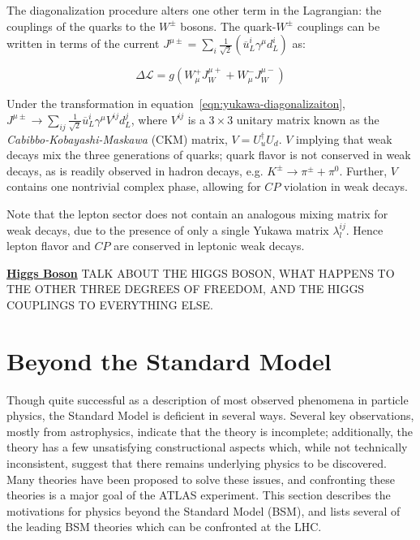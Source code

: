 The diagonalization procedure alters one other term in the Lagrangian: the couplings of the quarks to the $W^{\pm}$ bosons. The quark-$W^{\pm}$ couplings can be written in terms of the current $J^{\mu\pm}=\sum_{i} \frac1{\sqrt{2}}\left(\overline{u}_L^i\gamma^{\mu}d_L^i\right)$ as:

\begin{equation}
	\Delta\mathcal{L} = g (W^+_{\mu}J^{\mu+}_W + W^{-}_{\mu}J^{\mu -}_{W})
\end{equation}

Under the transformation in equation~\ref{eqn:yukawa-diagonalizaiton}, $J^{\mu\pm}\rightarrow \sum_{ij}\frac{1}{\sqrt{2}} \overline{u}_L^i \gamma^{\mu} V^{ij} d_L^j$, where $V^{ij}$ is a $3\times 3$ unitary matrix known as the \emph{Cabibbo-Kobayashi-Maskawa} (CKM) matrix, $V = U_{u}^{\dagger} U_d$. $V$ implying that weak decays mix the three generations of quarks; quark flavor is not conserved in weak decays, as is readily observed in hadron decays, e.g. $K^{\pm}\rightarrow \pi^{\pm}+\pi^0$. Further, $V$ contains one nontrivial complex phase, allowing for $CP$ violation in weak decays. 

Note that the lepton sector does not contain an analogous mixing matrix for weak decays, due to the presence of only a single Yukawa matrix $\lambda^{ij}_l$. Hence lepton flavor and $CP$ are conserved in leptonic weak decays.

\underline{\textbf{Higgs Boson}}
TALK ABOUT THE HIGGS BOSON, WHAT HAPPENS TO THE OTHER THREE DEGREES OF FREEDOM, AND THE HIGGS COUPLINGS TO EVERYTHING ELSE.




\section{Beyond the Standard Model}\label{sec:beyond-the-standard-model}
Though quite successful as a description of most observed phenomena in particle physics, the Standard Model is deficient in several ways. Several key observations, mostly from astrophysics, indicate that the theory is incomplete; additionally, the theory has a few unsatisfying constructional aspects which, while not technically inconsistent, suggest that there remains underlying physics to be discovered. Many theories have been proposed to solve these issues, and confronting these theories is a major goal of the ATLAS experiment. This section describes the motivations for physics beyond the Standard Model (BSM), and lists several of the leading BSM theories which can be confronted at the LHC.

